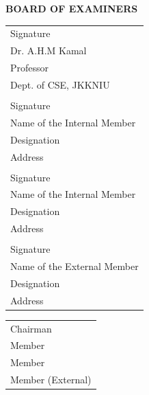 \documentclass{report}
\begin{document}
\vspace{2cm} %

\noindent
\textbf{\large BOARD OF EXAMINERS}\\

\noindent
\begin{minipage}[t]{0.8\textwidth}
    \begin{tabular}[t]{@{} l @{}}
        
        \quad Signature \\
        Dr. A.H.M Kamal \\
        Professor \\
        Dept. of CSE, JKKNIU \\
        \\
        \quad Signature \\
        Name of the Internal Member \\
        Designation \\
        Address \\
        \\
        \quad Signature \\
        Name of the Internal Member \\
        Designation \\
        Address \\
        \\
        \quad Signature \\
        Name of the External Member \\
        Designation \\
        Address \\
    \end{tabular}
\end{minipage}%
\hfill
\begin{minipage}[t]{0.4\textwidth}
    \begin{tabular}[t]{@{} l @{}}
        \vspace{2cm}
        Chairman \\
        \vspace{2cm}
        Member \\
        \vspace{2cm}
        Member \\
        \vspace{2cm}
        Member (External) \\
    \end{tabular}
\end{minipage}

\thispagestyle{empty}
\end{document}
